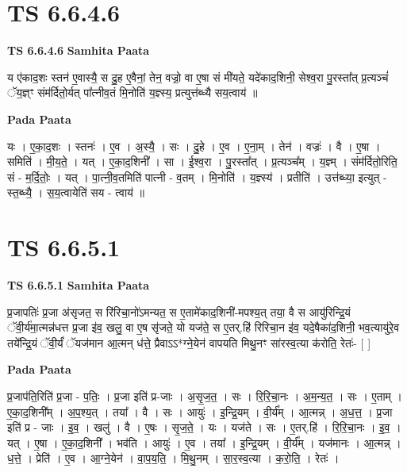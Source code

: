 \documentclass[17pt]{extarticle}
\begin{document}

\section{ TS 6.6.4.6 }

\textbf{TS 6.6.4.6 } \newline
\textbf{Samhita Paata} \newline

य ए॑काद॒शः स्तन॑ ए॒वास्यै॒ स दु॒ह ए॒वैनां॒ तेन॒ वज्रो॒ वा ए॒षा सं मी॑यते॒ यदे॑काद॒शिनी॒ सेश्व॒रा पु॒रस्ता᳚त् प्र॒त्यञ्चं॑ ॅय॒ज्ञ्ꣳ संम॑र्दितो॒र्यत् पा᳚त्नीव॒तं मि॒नोति॑ य॒ज्ञ्स्य॒ प्रत्युत्त॑ब्ध्यै सय॒त्वाय॑ ॥ \newline

\textbf{Pada Paata} \newline

यः । ए॒का॒द॒शः । स्तनः॑ । ए॒व । अ॒स्यै॒ । सः । दु॒हे । ए॒व । ए॒ना॒म् । तेन॑ । वज्रः॑ । वै । ए॒षा । समिति॑ । मी॒य॒ते॒ । यत् । ए॒का॒द॒शिनी᳚ । सा । ई॒श्व॒रा । पु॒रस्ता᳚त् । प्र॒त्यञ्च᳚म् । य॒ज्ञ्म् । संम॑र्दितो॒रिति॒ सं - म॒र्दि॒तोः॒ । यत् । पा॒त्नी॒व॒तमिति॑ पात्नी - व॒तम् । मि॒नोति॑ । य॒ज्ञ्स्य॑ । प्रतीति॑ । उत्त॑ब्ध्या॒ इत्युत् - स्त॒ब्ध्यै॒ । स॒य॒त्वायेति॑ सय - त्वाय॑ ॥  \newline





\section{ TS 6.6.5.1 }

\textbf{TS 6.6.5.1 } \newline
\textbf{Samhita Paata} \newline

प्र॒जापतिः॑ प्र॒जा अ॑सृजत॒ स रि॑रिचा॒नो॑ऽमन्यत॒ स ए॒तामे॑काद॒शिनी॑-मपश्य॒त् तया॒ वै स आयु॑रिन्द्रि॒यं ॅवी॒र्य॑मा॒त्मन्न॑धत्त प्र॒जा इ॑व॒ खलु॒ वा ए॒ष सृ॑जते॒ यो यज॑ते॒ स ए॒तर्.हि॑ रिरिचा॒न इ॑व॒ यदे॒षैका॑द॒शिनी॒ भव॒त्यायु॑रे॒व तये᳚न्द्रि॒यं ॅवी॒र्यं॑ ॅयज॑मान आ॒त्मन् ध॑त्ते॒ प्रैवाऽऽ*ग्ने॒येन॑ वापयति मिथु॒नꣳ सा॑रस्व॒त्या क॑रोति॒ रेतः॑- [  ] \newline

\textbf{Pada Paata} \newline

प्र॒जाप॑ति॒रिति॑ प्र॒जा - प॒तिः॒ । प्र॒जा इति॑ प्र-जाः । अ॒सृ॒ज॒त॒ । सः । रि॒रि॒चा॒नः । अ॒म॒न्य॒त॒ । सः । ए॒ताम् । ए॒का॒द॒शिनी᳚म् । अ॒प॒श्य॒त् । तया᳚ । वै । सः । आयुः॑ । इ॒न्द्रि॒यम् । वी॒र्य᳚म् । आ॒त्मन्न् । अ॒ध॒त्त॒ । प्र॒जा इति॑ प्र - जाः । इ॒व॒ । खलु॑ । वै । ए॒षः । सृ॒ज॒ते॒ । यः । यज॑ते । सः । ए॒तर्.हि॑ । रि॒रि॒चा॒नः । इ॒व॒ । यत् । ए॒षा । ए॒का॒द॒शिनी᳚ । भव॑ति । आयुः॑ । ए॒व । तया᳚ । इ॒न्द्रि॒यम् । वी॒र्य᳚म् । यज॑मानः । आ॒त्मन्न् । ध॒त्ते॒ । प्रेति॑ । ए॒व । आ॒ग्ने॒येन॑ । वा॒प॒य॒ति॒ । मि॒थु॒नम् । सा॒र॒स्व॒त्या । क॒रो॒ति॒ । रेतः॑ ।  \newline
\end{document}
